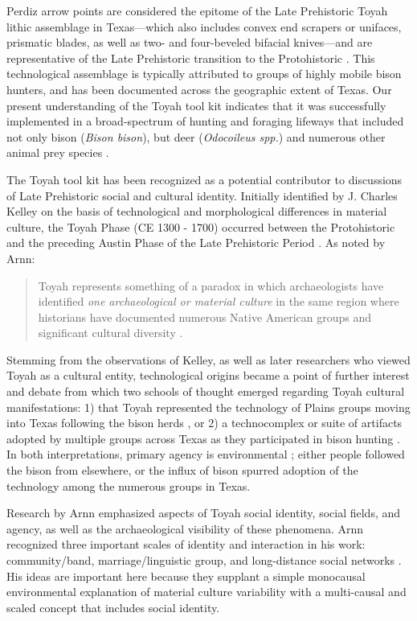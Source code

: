 \documentclass[smallextended]{svjour3}       %
\begin{document}
Perdiz arrow points are considered the epitome of the Late Prehistoric
Toyah lithic assemblage in Texas---which also includes convex end
scrapers or unifaces, prismatic blades, as well as two- and four-beveled
bifacial knives---and are representative of the Late Prehistoric
transition to the Protohistoric \cite{RN9718}. This technological
assemblage is typically attributed to groups of highly mobile bison
hunters, and has been documented across the geographic extent of Texas.
Our present understanding of the Toyah tool kit indicates that it was
successfully implemented in a broad-spectrum of hunting and foraging
lifeways that included not only bison (\emph{Bison bison}), but deer
(\emph{Odocoileus spp.}) and numerous other animal prey species
\cite{RN9718,RN9786}.

The Toyah tool kit has been recognized as a potential contributor to
discussions of Late Prehistoric social and cultural identity. Initially
identified by J. Charles Kelley on the basis of technological and
morphological differences in material culture, the Toyah Phase (CE 1300
- 1700) occurred between the Protohistoric and the preceding Austin
Phase of the Late Prehistoric Period \cite{RN9719,RN9720}. As noted by
Arnn:

\begin{quote}
Toyah represents something of a paradox in which archaeologists have
identified \emph{one archaeological or material culture} in the same
region where historians have documented numerous Native American groups
and significant cultural diversity \cite[47]{RN9718}.
\end{quote}

Stemming from the observations of Kelley, as well as later researchers
who viewed Toyah as a cultural entity, technological origins became a
point of further interest and debate from which two schools of thought
emerged regarding Toyah cultural manifestations: 1) that Toyah
represented the technology of Plains groups moving into Texas following
the bison herds \cite{RN9721,RN9722}, or 2) a technocomplex or suite of
artifacts adopted by multiple groups across Texas as they participated
in bison hunting \cite{RN9008,RN9723,RN9724}. In both interpretations,
primary agency is environmental \cite{RN9718}; either people followed
the bison from elsewhere, or the influx of bison spurred adoption of the
technology among the numerous groups in Texas.

Research by Arnn \cite{RN9718,RN9716,RN5784,RN9717} emphasized aspects
of Toyah social identity, social fields, and agency, as well as the
archaeological visibility of these phenomena. Arnn recognized three
important scales of identity and interaction in his work:
community/band, marriage/linguistic group, and long-distance social
networks \cite{RN9718}. His ideas are important here because they
supplant a simple monocausal environmental explanation of material
culture variability with a multi-causal and scaled concept that includes
social identity.
\end{document}
